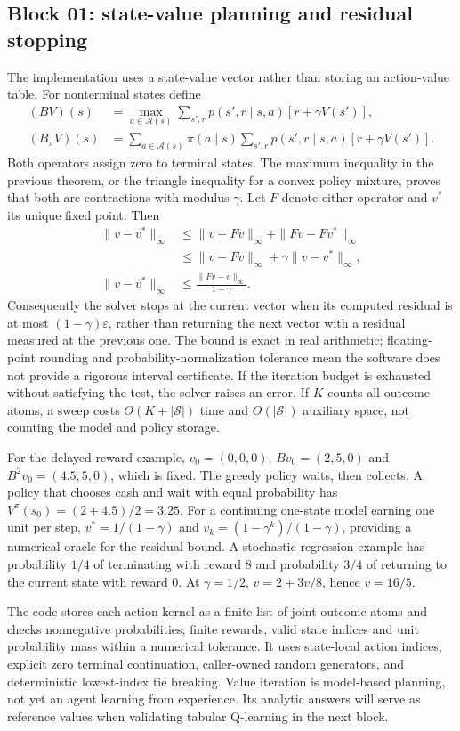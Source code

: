 \documentclass[11pt,a4paper]{article}
\newcommand{\Sset}{\mathcal S}
\newcommand{\Aset}{\mathcal A}
\begin{document}
\subsection{Block 01: state-value planning and residual stopping}
The implementation uses a state-value vector rather than storing an action-value table. For nonterminal states define
\begin{align*}
 (B V)(s)&=\max_{a\in\Aset(s)}\sum_{s',r}p(s',r\mid s,a)[r+\gamma V(s')],\\
 (B_\pi V)(s)&=\sum_{a\in\Aset(s)}\pi(a\mid s)\sum_{s',r}p(s',r\mid s,a)[r+\gamma V(s')].
\end{align*}
Both operators assign zero to terminal states. The maximum inequality in the previous theorem, or the triangle inequality for a convex policy mixture, proves that both are contractions with modulus $\gamma$. Let $F$ denote either operator and $v^*$ its unique fixed point. Then
\begin{align*}
 \|v-v^*\|_\infty&\leq\|v-Fv\|_\infty+\|Fv-Fv^*\|_\infty\\
 &\leq\|v-Fv\|_\infty+\gamma\|v-v^*\|_\infty,\\
 \|v-v^*\|_\infty&\leq\frac{\|Fv-v\|_\infty}{1-\gamma}.
\end{align*}
Consequently the solver stops at the current vector when its computed residual is at most $(1-\gamma)\varepsilon$, rather than returning the next vector with a residual measured at the previous one. The bound is exact in real arithmetic; floating-point rounding and probability-normalization tolerance mean the software does not provide a rigorous interval certificate. If the iteration budget is exhausted without satisfying the test, the solver raises an error. If $K$ counts all outcome atoms, a sweep costs $O(K+|\Sset|)$ time and $O(|\Sset|)$ auxiliary space, not counting the model and policy storage.

For the delayed-reward example, $v_0=(0,0,0)$, $Bv_0=(2,5,0)$ and $B^2v_0=(4.5,5,0)$, which is fixed. The greedy policy waits, then collects. A policy that chooses cash and wait with equal probability has $V^\pi(s_0)=(2+4.5)/2=3.25$. For a continuing one-state model earning one unit per step, $v^*=1/(1-\gamma)$ and $v_k=(1-\gamma^k)/(1-\gamma)$, providing a numerical oracle for the residual bound. A stochastic regression example has probability $1/4$ of terminating with reward 8 and probability $3/4$ of returning to the current state with reward 0. At $\gamma=1/2$, $v=2+3v/8$, hence $v=16/5$.

The code stores each action kernel as a finite list of joint outcome atoms and checks nonnegative probabilities, finite rewards, valid state indices and unit probability mass within a numerical tolerance. It uses state-local action indices, explicit zero terminal continuation, caller-owned random generators, and deterministic lowest-index tie breaking. Value iteration is model-based planning, not yet an agent learning from experience. Its analytic answers will serve as reference values when validating tabular Q-learning in the next block.
\end{document}
